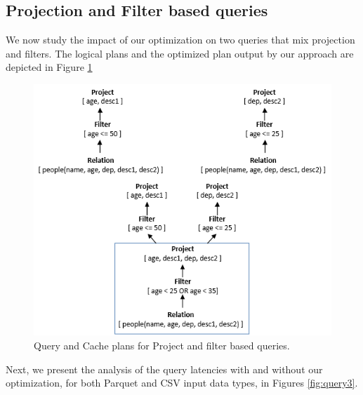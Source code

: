 \subsection{Projection and Filter based queries}
We now study the impact of our optimization on two queries that mix projection and filters. The logical plans and the optimized plan output by our approach are depicted in Figure \ref{fig:query3_plans}

\begin{figure}[ht]
   \centering
   \includegraphics[scale=0.5]{figures/query3_cacheplan}
   \caption{Query and Cache plans for Project and filter based queries.} 
   \label{fig:query3_plans}
\end{figure}

Next, we present the analysis of the query latencies with and without our optimization, for both Parquet and CSV input data types, in Figures \ref{fig:query3}.

